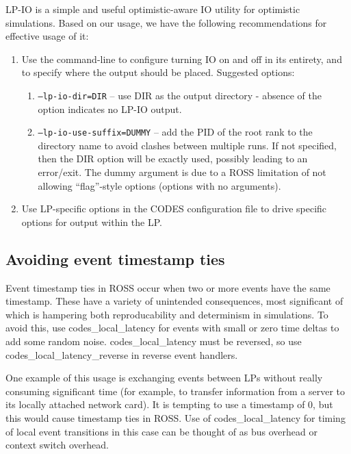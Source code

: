\documentclass[conference,10pt,compsocconf,onecolumn]{IEEEtran}
\begin{document}
LP-IO is a simple and useful optimistic-aware IO utility for optimistic
simulations. Based on our usage, we have the following recommendations for
effective usage of it:
\begin{enumerate}
    \item Use the command-line to configure turning IO on and off in its
        entirety, and to specify where the output should be placed. Suggested
        options:
        \begin{enumerate}
            \item \texttt{--lp-io-dir=DIR} -- use DIR as the output directory -
                absence of the option indicates no LP-IO output.
            \item \texttt{--lp-io-use-suffix=DUMMY} -- add the PID of the root
                rank to the directory name to avoid clashes between
                multiple runs. If not specified, then the DIR option
                will be exactly used, possibly leading to an error/exit. The
                dummy argument is due to a ROSS limitation of not allowing
                ``flag''-style options (options with no arguments).
        \end{enumerate}
    \item Use LP-specific options in the CODES configuration file to drive
        specific options for output within the LP.
\end{enumerate}

\subsection{Avoiding event timestamp ties}

Event timestamp ties in ROSS occur when two or more events have the same
timestamp. These have a variety of unintended consequences, most significant of
which is hampering both reproducability and determinism in simulations. To
avoid this, use codes\_local\_latency for events with small or zero time deltas
to add some random noise. codes\_local\_latency must be reversed, so use
codes\_local\_latency\_reverse in reverse event handlers.

One example of this usage is exchanging events between LPs without really
consuming significant time (for example, to transfer information from a server
to its locally attached network card). It is tempting to use a timestamp of 0,
but this would cause timestamp ties in ROSS. Use of codes\_local\_latency for
timing of local event transitions in this case can be thought of as bus
overhead or context switch overhead.
\end{document}
